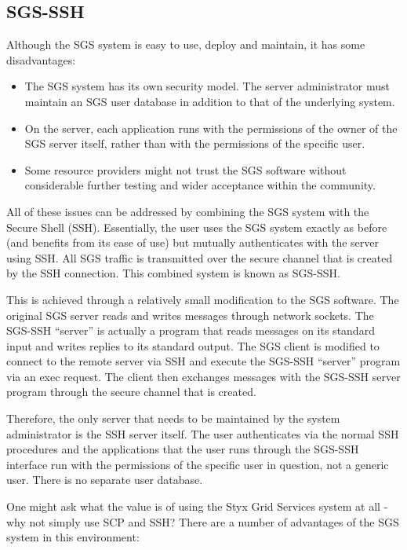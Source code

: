 \documentclass[a4paper]{article}
\begin{document}
\begin{multicols}{2}
\section{SGS-SSH}
Although the SGS system is easy to use, deploy and maintain, it has some disadvantages:

\begin{itemize}
\item The SGS system has its own security model.  The server administrator must maintain an SGS user database in addition to that of the underlying system.
\item On the server, each application runs with the permissions of the owner of the SGS server itself, rather than with the permissions of the specific user.
\item Some resource providers might not trust the SGS software without considerable further testing and wider acceptance within the community.
\end{itemize}

All of these issues can be addressed by combining the SGS system with the Secure Shell (SSH).  Essentially, the user uses the SGS system exactly as before (and benefits from its ease of use) but mutually authenticates with the server using SSH.  All SGS traffic is transmitted over the secure channel that is created by the SSH connection.  This combined system is known as SGS-SSH.

This is achieved through a relatively small modification to the SGS software.  The original SGS server reads and writes messages through network sockets.  The SGS-SSH ``server'' is actually a program that reads messages on its standard input and writes replies to its standard output.  The SGS client is modified to connect to the remote server via SSH and execute the SGS-SSH ``server'' program via an exec request.  The client then exchanges messages with the SGS-SSH server program through the secure channel that is created.

Therefore, the only server that needs to be maintained by the system administrator is the SSH server itself.  The user authenticates via the normal SSH procedures and the applications that the user runs through the SGS-SSH interface run with the permissions of the specific user in question, not a generic user.  There is no separate user database.

One might ask what the value is of using the Styx Grid Services system at all - why not simply use SCP and SSH?  There are a number of advantages of the SGS system in this environment:


\end{multicols}
\end{document}
